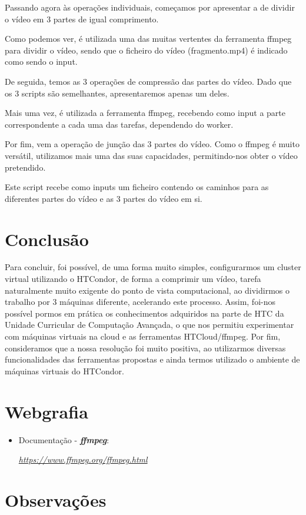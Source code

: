 \documentclass[a4paper]{report}
\begin{document}
	Passando agora às operações individuais, começamos por apresentar a de dividir o vídeo em 3 partes de igual comprimento.
	
	
	Como podemos ver, é utilizada uma das muitas vertentes da ferramenta ffmpeg para dividir o vídeo, sendo que o ficheiro do vídeo (fragmento.mp4) é indicado como sendo o input.
	
	De seguida, temos as 3 operações de compressão das partes do vídeo. Dado que os 3 scripts são semelhantes, apresentaremos apenas um deles.
	
	
	Mais uma vez, é utilizada a ferramenta ffmpeg, recebendo como input a parte correspondente a cada uma das tarefas, dependendo do worker.
	
	Por fim, vem a operação de junção das 3 partes do vídeo. Como o ffmpeg é muito versátil, utilizamos mais uma das suas capacidades, permitindo-nos obter o vídeo pretendido.
	
	
	Este script recebe como inputs um ficheiro contendo os caminhos para as diferentes partes do vídeo e as 3 partes do vídeo em si.

\chapter{Conclusão}
\large{
	Para concluir, foi possível, de uma forma muito simples, configurarmos um cluster virtual utilizando o HTCondor, de forma a comprimir um vídeo, tarefa naturalmente muito exigente do ponto de vista computacional, ao dividirmos o trabalho por 3 máquinas diferente, acelerando este processo.
	Assim, foi-nos possível pormos em prática os conhecimentos adquiridos na parte de HTC da Unidade Curricular de Computação Avançada, o que nos permitiu experimentar com máquinas virtuais na cloud e as ferramentas HTCloud/ffmpeg.
	Por fim, consideramos que a nossa resolução foi muito positiva, ao utilizarmos diversas funcionalidades das ferramentas propostas e ainda termos utilizado o ambiente de máquinas virtuais do HTCondor.
}

\chapter{Webgrafia}
    \begin{itemize}
        \item Documentação - \textbf{\textit{ffmpeg}}:
        \par \textit{\url{https://www.ffmpeg.org/ffmpeg.html}}
    \end{itemize}

\appendix
\chapter{Observações}
\end{document}
